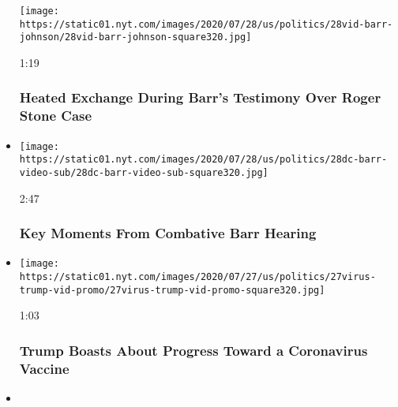 \begin{itemize}
  \texttt{[image: https://static01.nyt.com/images/2020/07/28/us/politics/28vid-barr-johnson/28vid-barr-johnson-square320.jpg]}

  1:19

  \hypertarget{heated-exchange-during-barrs-testimony-over-roger-stone-case}{%
  \subsubsection{Heated Exchange During Barr's Testimony Over Roger
  Stone
  Case}\label{heated-exchange-during-barrs-testimony-over-roger-stone-case}}
\item
  \href{https://www.nytimes.com/video/us/politics/100000007260259/barr-testifies-house-judiciary.html?action=click\&module=video-series-bar\&region=header\&pgtype=Article\&playlistId=video/us-politics}{}

  \texttt{[image: https://static01.nyt.com/images/2020/07/28/us/politics/28dc-barr-video-sub/28dc-barr-video-sub-square320.jpg]}

  2:47

  \hypertarget{key-moments-from-combative-barr-hearing}{%
  \subsubsection{Key Moments From Combative Barr
  Hearing}\label{key-moments-from-combative-barr-hearing}}
\item
  \href{https://www.nytimes.com/video/us/100000007258794/trump-boasts-vaccine-progress-north-carolina.html?action=click\&module=video-series-bar\&region=header\&pgtype=Article\&playlistId=video/us-politics}{}

  \texttt{[image: https://static01.nyt.com/images/2020/07/27/us/politics/27virus-trump-vid-promo/27virus-trump-vid-promo-square320.jpg]}

  1:03

  \hypertarget{trump-boasts-about-progress-toward-a-coronavirus-vaccine}{%
  \subsubsection{Trump Boasts About Progress Toward a Coronavirus
  Vaccine}\label{trump-boasts-about-progress-toward-a-coronavirus-vaccine}}
\item
  \href{https://www.nytimes.com/video/us/100000007259050/john-lewis-memorial-pelosi.html?action=click\&module=video-series-bar\&region=header\&pgtype=Article\&playlistId=video/us-politics}{}


\end{itemize}

